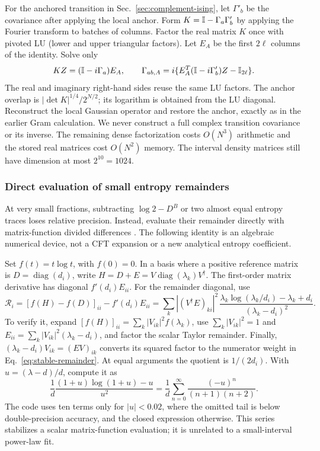 For the anchored transition in Sec.~\ref{sec:complement-ising}, let
$\Gamma'_b$ be the covariance after applying the local anchor.
Form $K=\mathbb I-\Gamma_a\Gamma'_b$ by applying the Fourier transform to
batches of columns. Factor the real matrix $K$ once with pivoted LU
(lower and upper triangular factors). Let $E_A$ be the first $2\ell$
columns of the identity. Solve only
\begin{equation}
 KZ=(\mathbb I-i\Gamma_a)E_A,\qquad
 \Gamma_{ab,A}=i\{E_A^T(\mathbb I-i\Gamma'_b)Z-\mathbb I_{2\ell}\}.
 \label{eq:local-transition-solve}
\end{equation}
The real and imaginary right-hand sides reuse the same LU factors.
The anchor overlap is $|\det K|^{1/4}/2^{N/2}$; its logarithm is
obtained from the LU diagonal. Reconstruct the local Gaussian operator
and restore the anchor, exactly as in the earlier Gram calculation.
We never construct a full complex transition covariance or its inverse.
The remaining dense factorization costs $O(N^3)$ arithmetic and the
stored real matrices cost $O(N^2)$ memory. The interval density matrices
still have dimension at most $2^{10}=1024$.

\subsubsection{Direct evaluation of small entropy remainders}
\label{sec:stable-entropy}
At very small fractions, subtracting $\log2-D^B$ or two almost equal
entropy traces loses relative precision. Instead, evaluate their
remainder directly with matrix-function divided differences
\cite{Higham}. The following identity is an algebraic numerical device,
not a CFT expansion or a new analytical entropy coefficient.

Set $f(t)=t\log t$, with $f(0)=0$. In a basis where a positive reference
matrix is $D=\operatorname{diag}(d_i)$, write
$H=D+E=V\operatorname{diag}(\lambda_k)V^\dagger$.
The first-order matrix derivative has diagonal $f'(d_i)E_{ii}$.
For the remainder diagonal, use
\begin{equation}
 \mathcal R_i=[f(H)-f(D)]_{ii}-f'(d_i)E_{ii}
 =\sum_k |(V^\dagger E)_{ki}|^2\,
 \frac{\lambda_k\log(\lambda_k/d_i)-\lambda_k+d_i}
      {(\lambda_k-d_i)^2}.
 \label{eq:stable-remainder}
\end{equation}
To verify it, expand $[f(H)]_{ii}=\sum_k|V_{ik}|^2f(\lambda_k)$,
use $\sum_k|V_{ik}|^2=1$ and
$E_{ii}=\sum_k|V_{ik}|^2(\lambda_k-d_i)$, and factor the scalar
Taylor remainder. Finally,
$(\lambda_k-d_i)V_{ik}=(EV)_{ik}$ converts its squared factor to
the numerator weight in Eq.~\eqref{eq:stable-remainder}.
At equal arguments the quotient is $1/(2d_i)$.
With $u=(\lambda-d)/d$, compute it as
\begin{equation}
 \frac1d\frac{(1+u)\log(1+u)-u}{u^2}
 =\frac1d\sum_{n=0}^{\infty}\frac{(-u)^n}{(n+1)(n+2)}.
 \label{eq:stable-scalar}
\end{equation}
The code uses ten terms only for $|u|<0.02$, where the omitted
tail is below double-precision accuracy, and the closed expression
otherwise. This series stabilizes a scalar matrix-function evaluation;
it is unrelated to a small-interval power-law fit.

